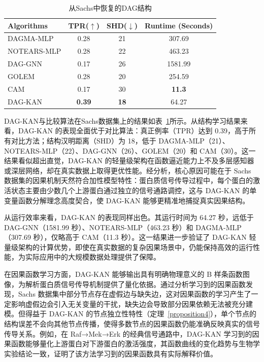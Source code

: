 \begin{table}[H]
	\caption{从Sachs中恢复的DAG结构}
	\label{table-Sachs}
	\centering
	\begin{tabular}{l c c c}
		\toprule
		Algorithms & TPR($\uparrow$) & SHD($\downarrow$) & Runtime (Seconds) \\
		\midrule
		DAGMA-MLP & 0.28 & 21 & 307.69  \\
		NOTEARS-MLP & 0.28 & 22 & 463.23  \\
		DAG-GNN & 0.17 & 26 & 1581.99  \\
		GOLEM & 0.28 & 20 & 254.59  \\
		CAM & 0.17 & 30 & \textbf{11.3}  \\
		DAG-KAN & \textbf{0.39} & \textbf{18} & 64.27  \\
		\bottomrule
	\end{tabular}
\end{table}

DAG-KAN与比较算法在Sachs数据集上的结果如表~\ref{table-Sachs}所示。从结构学习结果来看，DAG-KAN 的表现全面优于对比算法：真正例率（TPR）达到 0.39，高于所有对比方法；结构汉明距离（SHD）为 18，低于 DAGMA-MLP（21）、NOTEARS-MLP（22）、DAG-GNN（26）、GOLEM（20）和 CAM（30）。这一结果看似超出直觉，DAG-KAN 的轻量级架构在函数逼近能力上不及多层感知器或深层网络，却在真实数据上取得更优性能。经分析，核心原因可能在于 Sachs 数据集的因果机制天然符合加性模型特性：蛋白质信号传导过程中，每个蛋白的激活状态主要由少数几个上游蛋白通过独立的信号通路调控，这与 DAG-KAN 的单变量函数分解理念高度契合，使 DAG-KAN 能够更精准地捕捉真实因果结构。

从运行效率来看，DAG-KAN 的表现同样出色。其运行时间为 64.27 秒，远低于 DAG-GNN（1581.99 秒）、NOTEARS-MLP（463.23 秒）和 DAGMA-MLP（307.69 秒），仅略高于 CAM（11.3 秒）。这一结果进一步验证了 DAG-KAN 轻量级架构的计算优势，即使在真实数据的复杂因果场景中，仍能保持高效的运行性能，为实际应用中的大规模数据处理提供了保障。

在因果函数学习方面，DAG-KAN 能够输出具有明确物理意义的 B 样条函数图像，为解析蛋白质信号传导机制提供了量化依据。通过分析学习到的因果函数发现，Sachs 数据集中部分节点存在虚假边与缺失边，这对因果函数的学习产生了一定影响\pozhehao 虚假边会引入无关变量的干扰，缺失边会导致部分因果依赖无法被充分建模。但得益于 DAG-KAN 的节点独立性特性（定理~\ref{proposition4}），单个节点的结构误差不会向其他节点传播，使得多数节点的因果函数仍能准确反映真实的信号传导关系。例如，在 Raf→Mek→Erk 的经典信号通路中，DAG-KAN 学习到的因果函数能够量化上游蛋白对下游蛋白的激活强度，其函数曲线的变化趋势与生物学实验结论一致，证明了该方法学习到的因果函数具有实际解释价值。

